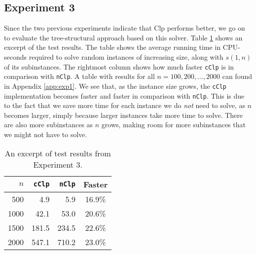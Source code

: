 \subsection*{Experiment 3}
Since the two previous experiments indicate that Clp performs better, we
go on to evaluate the tree-structural approach based on this solver.
Table \ref{table:expfour} shows an excerpt of the test results. The table
shows the average running time in CPU-seconds required to solve random instances
of increasing size, along with $s(1, n)$ of its subinstances. The rightmost
column shows how much faster \texttt{cClp} is in comparison with \texttt{nClp}.
A table with results for all $n=100,200,\ldots,2000$ can found in Appendix
\ref{app:exp1}.
We see that, as the instance size grows, the \texttt{cClp}
implementation becomes faster and faster in comparison with
\texttt{nClp}.
This is due to the fact that we save more time for each instance we do
\emph{not} need to solve, as $n$ becomes larger, simply because larger instances
take more time to solve.
There are also more subinstances as $n$ grows, making room for more subinstances
that we might not have to solve.

\begin{table}[ht!]
    \centering
    \caption{An excerpt of test results from Experiment 3.}
    \label{table:expfour}
\begin{tabular}{rrrc}
    $n$ & \texttt{cClp}  & \texttt{nClp}  & Faster \\ \hline
    500 & 4.9   & 5.9   & 16.9\% \\
   1000 & 42.1  & 53.0  & 20.6\% \\
   1500 & 181.5 & 234.5 & 22.6\% \\
   2000 & 547.1 & 710.2 & 23.0\%
\end{tabular}
\end{table}


